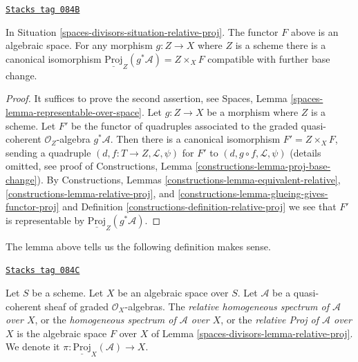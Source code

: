 \begin{lemma}
\label{spaces-divisors-lemma-relative-proj}
\href{https://stacks.math.columbia.edu/tag/084B}{\texttt{Stacks tag 084B}}

In Situation \ref{spaces-divisors-situation-relative-proj}. The functor $F$ above is an
algebraic space. For any morphism $g : Z \to X$ where $Z$ is a scheme
there is a canonical isomorphism
$\underline{\text{Proj}}_Z(g^*\mathcal{A}) = Z \times_X F$
compatible with further base change.
\end{lemma}

\begin{proof}
It suffices to prove the second assertion, see
Spaces, Lemma \ref{spaces-lemma-representable-over-space}.
Let $g : Z \to X$ be a morphism where $Z$ is a scheme.
Let $F'$ be the functor of quadruples associated
to the graded quasi-coherent $\mathcal{O}_Z$-algebra $g^*\mathcal{A}$.
Then there is a canonical isomorphism $F' = Z \times_X F$, sending
a quadruple $(d, f : T \to Z, \mathcal{L}, \psi)$ for $F'$
to $(d, g \circ f, \mathcal{L}, \psi)$ (details omitted, see proof of
Constructions, Lemma \ref{constructions-lemma-proj-base-change}).
By Constructions, Lemmas
\ref{constructions-lemma-equivalent-relative},
\ref{constructions-lemma-relative-proj}, and
\ref{constructions-lemma-glueing-gives-functor-proj} and
Definition \ref{constructions-definition-relative-proj}
we see that $F'$ is representable by
$\underline{\text{Proj}}_Z(g^*\mathcal{A})$.
\end{proof}

The lemma above tells us the following definition makes sense.

\begin{definition}
\label{spaces-divisors-definition-relative-proj}
\href{https://stacks.math.columbia.edu/tag/084C}{\texttt{Stacks tag 084C}}

Let $S$ be a scheme. Let $X$ be an algebraic space over $S$.
Let $\mathcal{A}$ be a quasi-coherent sheaf of
graded $\mathcal{O}_X$-algebras. The
{\it relative homogeneous spectrum of $\mathcal{A}$ over $X$},
or the {\it homogeneous spectrum of $\mathcal{A}$ over $X$}, or the
{\it relative Proj of $\mathcal{A}$ over $X$} is the algebraic space
$F$ over $X$ of Lemma \ref{spaces-divisors-lemma-relative-proj}.
We denote it $\pi : \underline{\text{Proj}}_X(\mathcal{A}) \to X$.
\end{definition}

